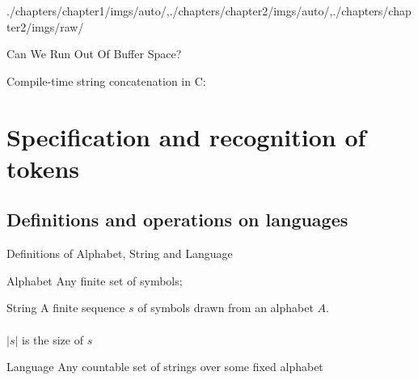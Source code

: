 \begin{graphicspathcontext}{{./chapters/chapter1/imgs/auto/},{./chapters/chapter2/imgs/auto/},{./chapters/chapter2/imgs/raw/}}
\begin{bibunit}[apalike]
\begin{frame}{{Can We Run Out Of} Buffer Space?}
	\begin{rightarrowsequence}
	\end{rightarrowsequence}
	\begin{example}
		Compile-time string concatenation in C: 
	\end{example}
\end{frame}


\section[Token Recognition]{Specification and recognition of tokens}
\sectiontableofcontentslide

\subsection{Definitions and operations on languages}
\subsectiontableofcontentslide

\begin{frame}{Definitions of Alphabet, String and Language}
	\begin{definitionblock}{Alphabet}
		Any finite set of symbols; 
	\end{definitionblock}
	\vspace{.25cm}
	\begin{definitionblock}{String}
		A finite sequence $s$ of symbols drawn from an alphabet $A$. \\
		 \\
		$|s|$ is the size of $s$
	\end{definitionblock}
	\vspace{.25cm}
	\begin{definitionblock}{Language}
		Any countable set of strings over some fixed alphabet \\
	\end{definitionblock}
\end{frame}


\end{bibunit}
\end{graphicspathcontext}
